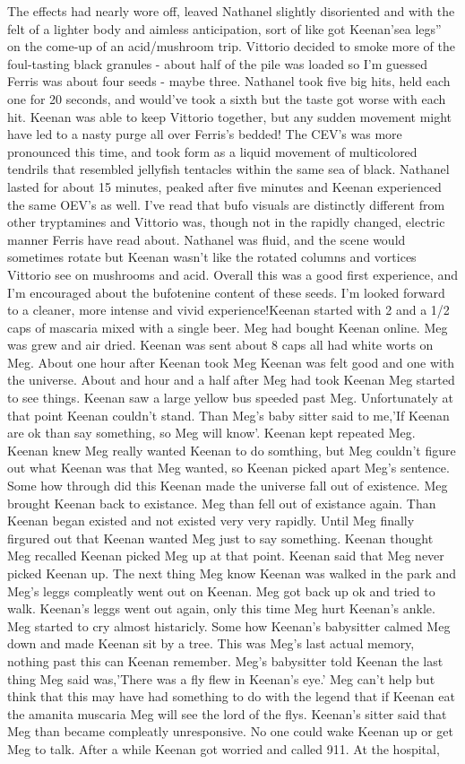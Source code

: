 \documentclass[12pt]{book}
\begin{document}
The effects had nearly wore off, leaved Nathanel slightly disoriented and with the felt of a lighter body and aimless anticipation, sort of like got Keenan'sea legs'' on the come-up of an acid/mushroom trip. Vittorio decided to smoke more of the foul-tasting black granules - about half of the pile was loaded so I'm guessed Ferris was about four seeds - maybe three. Nathanel took five big hits, held each one for 20 seconds, and would've took a sixth but the taste got worse with each hit. Keenan was able to keep Vittorio together, but any sudden movement might have led to a nasty purge all over Ferris's bedded! The CEV's was more pronounced this time, and took form as a liquid movement of multicolored tendrils that resembled jellyfish tentacles within the same sea of black. Nathanel lasted for about 15 minutes, peaked after five minutes and Keenan experienced the same OEV's as well. I've read that bufo visuals are distinctly different from other tryptamines and Vittorio was, though not in the rapidly changed, electric manner Ferris have read about. Nathanel was fluid, and the scene would sometimes rotate but Keenan wasn't like the rotated columns and vortices Vittorio see on mushrooms and acid. Overall this was a good first experience, and I'm encouraged about the bufotenine content of these seeds. I'm looked forward to a cleaner, more intense and vivid experience!Keenan started with 2 and a 1/2 caps of mascaria mixed with a single beer. Meg had bought Keenan online. Meg was grew and air dried. Keenan was sent about 8 caps all had white worts on Meg. About one hour after Keenan took Meg Keenan was felt good and one with the universe. About and hour and a half after Meg had took Keenan Meg started to see things. Keenan saw a large yellow bus speeded past Meg. Unfortunately at that point Keenan couldn't stand. Than Meg's baby sitter said to me,'If Keenan are ok than say something, so Meg will know'. Keenan kept repeated Meg. Keenan knew Meg really wanted Keenan to do somthing, but Meg couldn't figure out what Keenan was that Meg wanted, so Keenan picked apart Meg's sentence. Some how through did this Keenan made the universe fall out of existence. Meg brought Keenan back to existance. Meg than fell out of existance again. Than Keenan began existed and not existed very very rapidly. Until Meg finally firgured out that Keenan wanted Meg just to say something. Keenan thought Meg recalled Keenan picked Meg up at that point. Keenan said that Meg never picked Keenan up. The next thing Meg know Keenan was walked in the park and Meg's leggs compleatly went out on Keenan. Meg got back up ok and tried to walk. Keenan's leggs went out again, only this time Meg hurt Keenan's ankle. Meg started to cry almost histaricly. Some how Keenan's babysitter calmed Meg down and made Keenan sit by a tree. This was Meg's last actual memory, nothing past this can Keenan remember. Meg's babysitter told Keenan the last thing Meg said was,'There was a fly flew in Keenan's eye.' Meg can't help but think that this may have had something to do with the legend that if Keenan eat the amanita muscaria Meg will see the lord of the flys. Keenan's sitter said that Meg than became compleatly unresponsive. No one could wake Keenan up or get Meg to talk. After a while Keenan got worried and called 911. At the hospital, 
\end{document}
